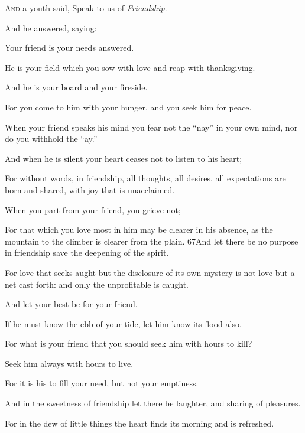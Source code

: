 \lettrine{A}{nd} a youth said, Speak to us of
\textit{Friendship}.

\medskip
And he answered, saying:

Your friend is your needs answered.

He is your field which you sow with love
and reap with thanksgiving.

And he is your board and your fireside.

For you come to him with your hunger,
and you seek him for peace.

When your friend speaks his mind you
fear not the \enquote{nay} in your own mind, nor
do you withhold the \enquote{ay.}

And when he is silent your heart ceases
not to listen to his heart;

For without words, in friendship, all
thoughts, all desires, all expectations
are born and shared, with joy that is
unacclaimed.

When you part from your friend, you
grieve not;

For that which you love most in him
may be clearer in his absence, as the
mountain to the climber is clearer
from the plain. {67}And let there be no
purpose in friendship save the deepening
of the spirit.

For love that seeks aught but the
disclosure of its own mystery is not
love but a net cast forth: and only the
unprofitable is caught.

And let your best be for your friend.

If he must know the ebb of your tide,
let him know its flood also.

For what is your friend that you should
seek him with hours to kill?

Seek him always with hours to live.

For it is his to fill your need, but not
your emptiness.

And in the sweetness of friendship
let there be laughter, and sharing of
pleasures.

For in the dew of little things
the heart finds its morning and is
refreshed.
